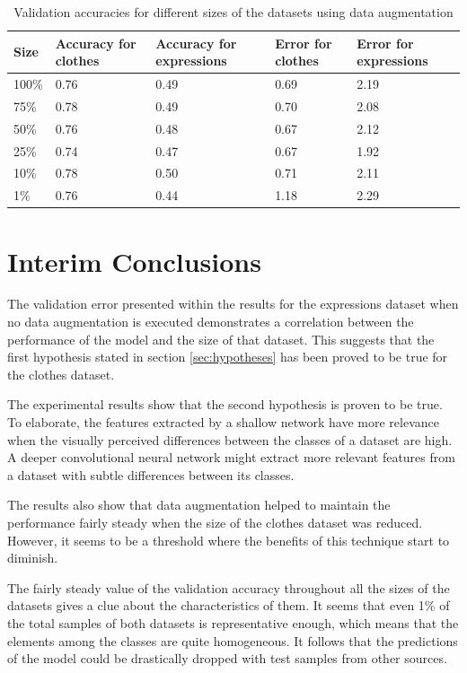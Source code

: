 \documentclass{article}
\begin{document}
\begin{table}[!htb]
  \centering
  \begin{tabular}{| l | l | l | l | l |}
    \hline
    \textbf{Size} & \textbf{Accuracy for clothes} & \textbf{Accuracy for expressions}& \textbf{Error for clothes} & \textbf{Error for expressions}\\ \hline
    100\% & 0.76 & 0.49 & 0.69 & 2.19\\ \hline
    75\% & 0.78  & 0.49 & 0.70 & 2.08\\ \hline
    50\% & 0.76 & 0.48 & 0.67 & 2.12\\ \hline
    25\% & 0.74 & 0.47 & 0.67 & 1.92\\ \hline
    10\% & 0.78 & 0.50 & 0.71 & 2.11\\ \hline
    1\% & 0.76 & 0.44 & 1.18 & 2.29\\ \hline

  \end{tabular}
  \caption{Validation accuracies for different sizes of the datasets using data augmentation}
  \label{tab:3}
\end{table}


\section{Interim Conclusions}
\label{sec:conclusions}

The validation error presented within the results for the expressions dataset when no data augmentation is executed demonstrates a correlation between the performance of the model and the size of that dataset. This suggests that the first hypothesis stated in section \ref{sec:hypotheses} has been proved to be true for the clothes dataset. 

The experimental results show that the second hypothesis is proven to be true. To elaborate, the features extracted by a shallow network have more relevance when the visually perceived differences between the classes of a dataset are high. A deeper convolutional neural network might extract more relevant features from a dataset with subtle differences between its classes.

The results also show that data augmentation helped to maintain the performance fairly steady when the size of the clothes dataset was reduced. However, it seems to be a threshold where the benefits of this technique start to diminish.

The fairly steady value of the validation accuracy throughout all the sizes of the datasets gives a clue about the characteristics of them. It seems that even 1\% of the total samples of both datasets is representative enough, which means that the elements among the classes are quite homogeneous. It follows that the predictions of the model could be drastically dropped with test samples from other sources.
\end{document}
